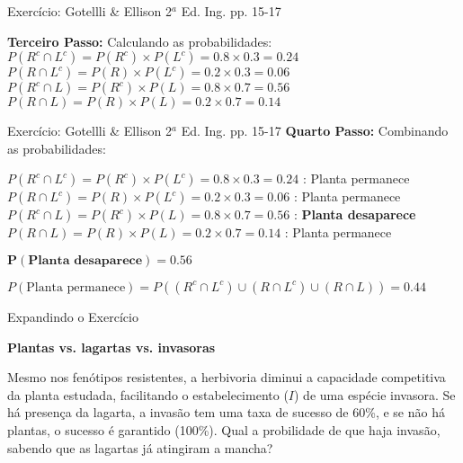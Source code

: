 \documentclass{beamer}\usepackage[]{graphicx}\usepackage[]{color}
\begin{document}
\begin{frame}{Exercício: Gotellli \& Ellison 2$^a$ Ed. Ing. pp. 15-17}

\textbf{Terceiro Passo:} Calculando as probabilidades:
\vfill
$P(R^c \cap L^c) = P(R^c) \times P(L^c) = 0.8 \times 0.3 = 0.24$
\vfill
$P(R \cap L^c) = P(R) \times P(L^c) = 0.2 \times 0.3 = 0.06$
\vfill
$P(R^c \cap L) = P(R^c) \times P(L) = 0.8 \times 0.7 = 0.56$
\vfill
$P(R \cap L) = P(R) \times P(L) = 0.2 \times 0.7 = 0.14$


\end{frame}

\begin{frame}{Exercício: Gotellli \& Ellison 2$^a$ Ed. Ing. pp. 15-17}
\textbf{Quarto Passo:} Combinando as probabilidades:
\begin{small}
\vfill
$P(R^c \cap L^c) = P(R^c) \times P(L^c) = 0.8 \times 0.3 = 0.24$ : Planta permanece
\vfill
$P(R \cap L^c) = P(R) \times P(L^c) = 0.2 \times 0.3 = 0.06$ : Planta permanece
\vfill
$P(R^c \cap L) = P(R^c) \times P(L) = 0.8 \times 0.7 = 0.56$ : \textbf{Planta desaparece}
\vfill
$P(R \cap L) = P(R) \times P(L) = 0.2 \times 0.7 = 0.14$ : Planta permanece
\vfill
\end{small}
$\mathbf{P(\textbf{Planta desaparece}) = 0.56}$

$P(\text{Planta permanece}) = P((R^c \cap L^c) \cup (R \cap L^c) \cup (R \cap L))  = 0.44$ 

\end{frame}



\begin{frame}{Expandindo o Exercício}

\textbf{Plantas vs. lagartas vs. invasoras}

\begin{small}

Mesmo nos fenótipos resistentes, a herbivoria diminui a capacidade competitiva da planta estudada, facilitando o estabelecimento ($I$) de uma espécie invasora. Se há presença da lagarta, a invasão tem uma taxa de sucesso de 60\%, e se não há plantas, o sucesso é garantido (100\%). 
\vfill
Qual a probilidade de que haja invasão, sabendo que as lagartas já atingiram a mancha?

\end{small}

\end{frame}
\end{document}
